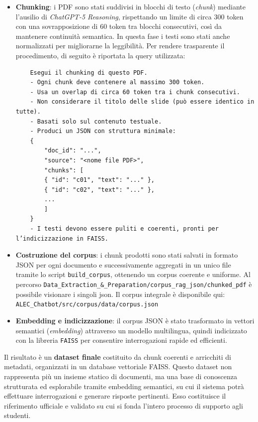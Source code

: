 \documentclass[a4paper,9pt]{article}
\begin{document}
\begin{itemize}
	\item \textbf{Chunking}: i PDF sono stati suddivisi in blocchi di testo (\textit{chunk}) mediante l’ausilio di \textit{ChatGPT-5 Reasoning}, rispettando un limite di circa 300 token con una sovrapposizione di 60 token tra blocchi consecutivi, così da mantenere continuità semantica. In questa fase i testi sono stati anche normalizzati per migliorarne la leggibilità. Per rendere trasparente il procedimento, di seguito è riportata la query utilizzata:

\begin{verbatim}
	Esegui il chunking di questo PDF. 
	- Ogni chunk deve contenere al massimo 300 token. 
	- Usa un overlap di circa 60 token tra i chunk consecutivi. 
	- Non considerare il titolo delle slide (può essere identico in tutte). 
	- Basati solo sul contenuto testuale. 
	- Produci un JSON con struttura minimale:
	{
		"doc_id": "...",
		"source": "<nome file PDF>",
		"chunks": [
		{ "id": "c01", "text": "..." },
		{ "id": "c02", "text": "..." },
		...
		]
	}
	- I testi devono essere puliti e coerenti, pronti per l’indicizzazione in FAISS.
\end{verbatim}

	\item \textbf{Costruzione del corpus}: i chunk prodotti sono stati salvati in formato JSON per ogni documento e successivamente aggregati in un unico file tramite lo script \texttt{build\_corpus}, ottenendo un corpus coerente e uniforme. Al percorso \texttt{Data\_Extraction\_\&\_Preparation/corpus\_rag\_json/chunked\_pdf} è possibile visionare i singoli json. Il corpus integrale è disponibile qui: \texttt{ALEC\_Chatbot/src/corpus/data/corpus.json}
	\item \textbf{Embedding e indicizzazione}: il corpus JSON è stato trasformato in vettori semantici (\textit{embedding}) attraverso un modello multilingua, quindi indicizzato con la libreria \texttt{FAISS} per consentire interrogazioni rapide ed efficienti.
\end{itemize}
Il risultato è un \textbf{dataset finale} costituito da chunk coerenti e arricchiti di metadati, organizzati in un database vettoriale FAISS.  
Questo dataset non rappresenta più un insieme statico di documenti, ma una base di conoscenza strutturata ed esplorabile tramite embedding semantici, su cui il sistema potrà effettuare interrogazioni e generare risposte pertinenti.  
Esso costituisce il riferimento ufficiale e validato su cui si fonda l’intero processo di supporto agli studenti.
\end{document}
